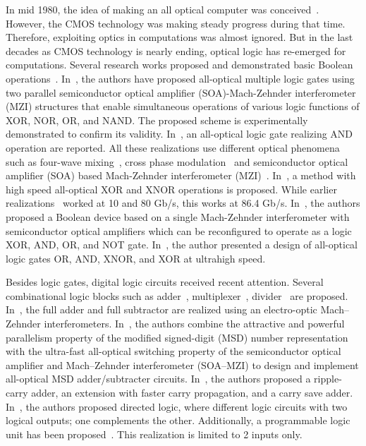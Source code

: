 \documentclass[10pt,letterpaper,twoside,openright]{book}
\begin{document}
In mid 1980, the idea of making an all optical computer was conceived~\cite{TODO}. However, the CMOS technology was making steady progress during that time. Therefore, exploiting optics in computations was almost ignored. But in the last decades as CMOS technology is nearly ending, optical logic has re-emerged for computations. Several research works proposed and demonstrated basic Boolean operations~\cite{TODO}. In~\cite{Kim:06}, the authors have proposed all-optical multiple logic gates using two parallel semiconductor optical amplifier (SOA)-Mach-Zehnder interferometer (MZI) structures that enable simultaneous operations of various logic functions of XOR, NOR, OR, and NAND. The proposed scheme is experimentally demonstrated to confirm its validity. In~\cite{Nesset1995896,Houbavlis20041622,Kim2004608,dong200680gb}, an all-optical logic gate realizing AND operation are reported. All these realizations use different optical phenomena such as four-wave mixing~\cite{Nesset1995896}, cross phase modulation~\cite{Houbavlis20041622,Kim2004608} and semiconductor optical amplifier (SOA) based Mach-Zehnder interferometer (MZI)~\cite{dong200680gb}. In~\cite{kang2009all}, a method with high speed all-optical XOR and XNOR operations is proposed. While earlier realizations~\cite{Kim:06,dong200680gb} worked at 10 and 80 Gb/s, this works at 86.4 Gb/s. In~\cite{Martinez2007}, the authors proposed a Boolean device based on a single Mach-Zehnder interferometer with semiconductor optical amplifiers which can be reconfigured to operate as a logic XOR, AND, OR, and NOT gate. In~\cite{singh2012ultrahigh}, the author presented a design  of
all-optical  logic  gates  OR,  AND,  XNOR,  and  XOR  at  ultrahigh
speed. 

Besides logic gates, digital logic circuits received recent attention. Several combinational logic blocks such as adder~\cite{DattaCS15,cherri2010circuit,kumar2014implementation}, multiplexer~\cite{Datta2014}, divider~\cite{Aikawa2011} are proposed. In~\cite{kumar2014implementation}, the full adder and full subtractor are realized using an electro-optic Mach--Zehnder interferometers. In~\cite{cherri2010circuit}, the authors combine the attractive and powerful parallelism property of the modified signed-digit (MSD) number representation with the ultra-fast all-optical switching property of the semiconductor optical amplifier and Mach–Zehnder interferometer (SOA–MZI) to design and implement all-optical MSD adder/subtracter circuits. In~\cite{DattaCS15}, the authors proposed a ripple-carry adder, an extension with faster carry propagation, and a carry save adder. In~\cite{}, the authors proposed directed logic, where different logic circuits with two logical outputs; one
complements the other. Additionally, a programmable logic unit has been proposed~\cite{Chattopadhyay:11}. This realization is limited to 2 inputs only.
\end{document}
